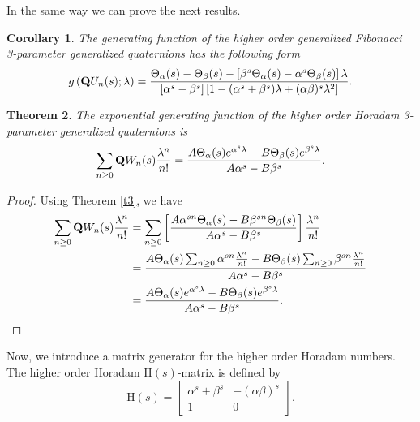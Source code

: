\documentclass{kms-c}
\theoremstyle{plain}
\newtheorem{theorem}{Theorem}[section]
\newtheorem{corollary}[theorem]{Corollary}
\theoremstyle{definition}
\theoremstyle{remark}
\begin{document}
In the same way we can prove the next results.
\begin{corollary}
The generating function of the higher order generalized Fibonacci 3-parameter generalized quaternions has the following form
\[
g\left(\textnormal{\textbf{Q}}U_{n}(s);\lambda\right)=\frac{\Theta_{\alpha}(s)-\Theta_{\beta}(s)-\left[\beta^{s}\Theta_{\alpha}(s)-\alpha^{s}\Theta_{\beta}(s)\right]\lambda}{\left[\alpha^{s}-\beta^{s}\right]\left[1-(\alpha^{s}+\beta^{s})\lambda+(\alpha\beta)^{s}\lambda^{2}\right]}.
\]
\end{corollary}

\begin{theorem}
The exponential generating function of the higher order Horadam 3-parameter generalized quaternions is
\[
\sum_{n\geq 0}\textnormal{\textbf{Q}}W_{n}(s)\frac{\lambda^{n}}{n!}=\frac{A\Theta_{\alpha}(s)e^{\alpha^{s}\lambda}-B\Theta_{\beta}(s)e^{\beta^{s}\lambda}}{A\alpha^{s}-B\beta^{s}}.
\]
\end{theorem}
\begin{proof}
Using Theorem \ref{t3}, we have
\begin{align*}
\sum_{n\geq 0}\textnormal{\textbf{Q}}W_{n}(s)\frac{\lambda^{n}}{n!}&=\sum_{n\geq 0}\left[\frac{A\alpha^{sn}\Theta_{\alpha}(s)-B\beta^{sn}\Theta_{\beta}(s)}{A\alpha^{s}-B\beta^{s}}\right]\frac{\lambda^{n}}{n!}\\
&=\frac{A\Theta_{\alpha}(s)\sum_{n\geq 0}\alpha^{sn}\frac{\lambda^{n}}{n!}-B\Theta_{\beta}(s)\sum_{n\geq 0}\beta^{sn}\frac{\lambda^{n}}{n!}}{A\alpha^{s}-B\beta^{s}}\\
&=\frac{A\Theta_{\alpha}(s)e^{\alpha^{s}\lambda}-B\Theta_{\beta}(s)e^{\beta^{s}\lambda}}{A\alpha^{s}-B\beta^{s}}.
\end{align*}
\end{proof}


Now, we introduce a matrix generator for the higher order Horadam numbers. The higher order Horadam $\textrm{H}(s)$-matrix is defined by
\begin{equation}\label{mat}
\textrm{H}(s)=\left[\begin{array}{rr} \alpha^{s}+\beta^{s}& -(\alpha\beta)^{s}\\
1&0\end{array}\right].
\end{equation}
\end{document}

